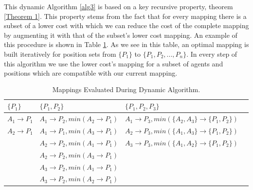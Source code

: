 This dynamic Algorithm \ref{alg3} is based on a key recursive property, theorem \ref{Theorem 1}.  This property stems from the fact that for every mapping there is a subset of a lower cost with which we can reduce the cost of the complete mapping by augmenting  it with that of the subset's lower cost mapping. An example of this procedure is shown in Table \ref{tab:DynamicTable}. As we see in this table, an optimal mapping is built iteratively for position sets from $\lbrace P_{1} \rbrace$ to $\lbrace P_{1},P_{2},...,P_{n} \rbrace$. In every step of this algorithm we use the lower cost's mapping for a subset of agents and positions which are compatible with our current mapping.



\begin{table}[htb!]
\label{tab:DynamicTable}
\centering
    \begin{tabular}{ | l | l | l | p{5cm} |}
    \hline
    $\lbrace P_{1} \rbrace$   & $\lbrace P_{1},P_{2} \rbrace$ 	& $\lbrace P_{1},P_{2},P_{3} \rbrace$\\ \hline
    $A_{1} \rightarrow P_{1}$ & $A_{1} \rightarrow P_{2},min(A_{2} \rightarrow P_{1})$	 	& $A_{1} \rightarrow P_{3},min(\lbrace A_{2},A_{3} \rbrace \rightarrow \lbrace P_{1},P_{2} \rbrace)$  \\ \hline
    $A_{2} \rightarrow P_{1}$ & $A_{1} \rightarrow P_{1},min(A_{3} \rightarrow P_{1})$	 	& $A_{2} \rightarrow P_{3},min(\lbrace A_{1},A_{3} \rbrace \rightarrow \lbrace P_{1},P_{2} \rbrace)$  \\ \hline
     						  & $A_{2} \rightarrow P_{2},min(A_{1} \rightarrow P_{1})$ 		& $A_{3} \rightarrow P_{3},min(\lbrace A_{1},A_{2} \rbrace \rightarrow \lbrace P_{1},P_{2} \rbrace)$  \\ \hline
       						  & $A_{2} \rightarrow P_{2},min(A_{3} \rightarrow P_{1})$ 		&   \\ \hline
       						  & $A_{3} \rightarrow P_{2},min(A_{1} \rightarrow P_{1})$ 		&   \\ \hline
    						  & $A_{3} \rightarrow P_{2},min(A_{2} \rightarrow P_{1})$		&   \\
    \hline

    \end{tabular}
    
    \caption{Mappings Evaluated During Dynamic Algorithm.}    
\end{table}

